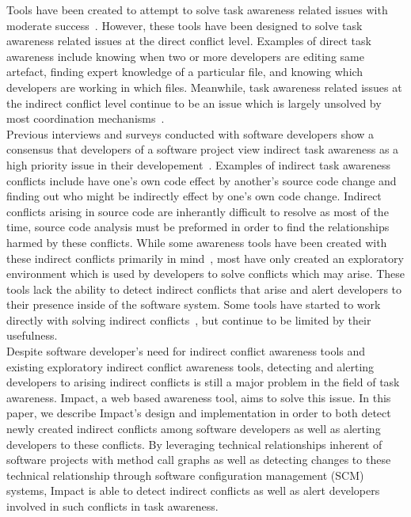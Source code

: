 \documentclass[conference]{IEEEtran}
\begin{document}
Tools have been created to attempt to solve task awareness related issues
with moderate success~\cite{Xiang:2008:ERT, Biehl:2007:FVD, Sarma:2009:TIV, 
Khurana:2009:PFC}. However, these tools have been designed 
to solve task awareness related issues at the direct conflict level. 
Examples of direct task awareness include knowing when two or more 
developers are  editing same artefact, finding expert knowledge of a
particular file, and knowing which developers are working in which files.
Meanwhile, task awareness related issues at the indirect conflict level
continue to be an issue which is largely unsolved by most coordination
mechanisms~\cite{Khurana:2009:PFC}.\\

Previous interviews and surveys conducted with software developers show a 
consensus that developers of a software project view indirect task awareness 
as a high priority issue in their developement~\cite{Damian:2007:GSE, 
Halverson:2006:DTV, Begel:2010:CDE}. Examples of indirect task awareness
conflicts include have one's own code effect by another's source
code change and finding out who might be indirectly effect by one's
own code change. Indirect conflicts arising in source code are inherantly
difficult to resolve as most of the time, source code analysis must
be preformed in order to find the relationships harmed by these conflicts.
While some awareness tools have been created with these indirect conflicts
primarily in mind~\cite{Begel:2010:CDE, Trainer:2005:BGT}, most have only 
created an exploratory environment which is used by developers to
solve conflicts which may arise. These tools lack the ability to detect
indirect conflicts that arise and alert developers to their presence 
inside of the software system. Some tools have started to work directly
with solving indirect conflicts~\cite{Sarma:2007:TSA}, but continue
to be limited by their usefulness.\\ 

Despite software developer's need for indirect conflict awareness tools
and existing exploratory indirect conflict awareness tools, detecting
and alerting developers to arising indirect conflicts is still a major
problem in the field of task awareness. Impact, a web based awareness
tool, aims to solve this issue. In this paper, we describe Impact's
design and implementation in order to both detect newly created
indirect conflicts among software developers as well as alerting developers
to these conflicts. By leveraging technical relationships inherent of 
software projects with method call graphs as well as detecting changes
to these technical relationship through software configuration management
(SCM) systems, Impact is able to detect indirect conflicts as well as
alert developers involved in such conflicts in task awareness.\\
\end{document}
